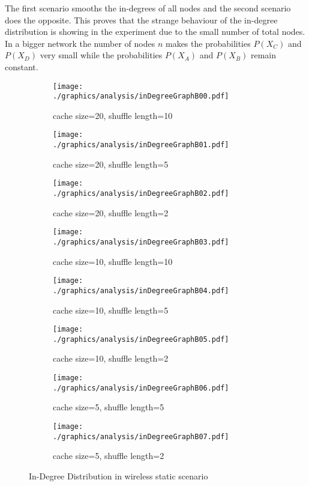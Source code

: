 The first scenario smooths the in-degrees of all nodes and the second
scenario does the opposite. This proves that the strange behaviour of the
in-degree distribution is showing in the experiment due to the small number of
total nodes. In a bigger network the number of nodes $n$ makes the
probabilities $P(X_C)$ and $P(X_D)$ very small while the probabilities $P(X_A)$
and $P(X_B)$ remain constant.

\begin{figure}
\begin{subfigure}{.5\textwidth}
	\texttt{[image: ./graphics/analysis/inDegreeGraphB00.pdf]}
	\caption{cache size=20, shuffle
	length=10}
	\label{fig:inDegreeDistB00small}
\end{subfigure}%
\begin{subfigure}{.5\textwidth}
	\texttt{[image: ./graphics/analysis/inDegreeGraphB01.pdf]}
	\caption{cache size=20, shuffle
	length=5}
	\label{fig:inDegreeDistB01small}
\end{subfigure}
\begin{subfigure}{.5\textwidth}
	\texttt{[image: ./graphics/analysis/inDegreeGraphB02.pdf]}
	\caption{cache size=20, shuffle
	length=2}
	\label{fig:inDegreeDistB02small}
\end{subfigure}%
\begin{subfigure}{.5\textwidth}
	\texttt{[image: ./graphics/analysis/inDegreeGraphB03.pdf]}
	\caption{cache size=10, shuffle
	length=10}
	\label{fig:inDegreeDistB03small}
\end{subfigure}
\begin{subfigure}{.5\textwidth}
	\texttt{[image: ./graphics/analysis/inDegreeGraphB04.pdf]}
	\caption{cache size=10, shuffle
	length=5}
	\label{fig:inDegreeDistB04small}
\end{subfigure}%
\begin{subfigure}{.5\textwidth}
	\texttt{[image: ./graphics/analysis/inDegreeGraphB05.pdf]}
	\caption{cache size=10, shuffle
	length=2}
	\label{fig:inDegreeDistB05small}
\end{subfigure}
\begin{subfigure}{.5\textwidth}
	\texttt{[image: ./graphics/analysis/inDegreeGraphB06.pdf]}
	\caption{cache size=5, shuffle
	length=5}
	\label{fig:inDegreeDistB06small}
\end{subfigure}%
\begin{subfigure}{.5\textwidth}
	\texttt{[image: ./graphics/analysis/inDegreeGraphB07.pdf]}
	\caption{cache size=5, shuffle
	length=2}
	\label{fig:inDegreeDistB07small}
\end{subfigure}
\caption{In-Degree Distribution in wireless static scenario}
\end{figure}

